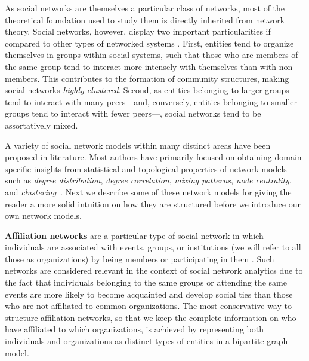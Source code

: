 As social networks are themselves a particular class of networks, most of the theoretical foundation used to study them is directly inherited from network theory.
%
Social networks, however, display two important particularities if compared to other types of networked systems \cite{Newman2003d}.
First, entities tend to organize themselves in groups within social systems, such that those who are members of the same group tend to interact more intensely with themselves than with non-members.
This contributes to the formation of community structures, making social networks \textit{highly clustered}.
Second, as entities belonging to larger groups tend to interact with many peers---and, conversely, entities belonging to smaller groups tend to interact with fewer peers---, social networks tend to be assortatively mixed.

A variety of social network models within many distinct areas have been proposed in literature.
Most authors have primarily focused on obtaining domain-specific insights from statistical and topological properties of network models such as \textit{degree distribution}, \textit{degree correlation}, \textit{mixing patterns}, \textit{node centrality}, and \textit{clustering}~\cite{Newman2003b}.
Next we describe some of these network models for giving the reader a more solid intuition on how they are structured before we introduce our own network models.


\textbf{Affiliation networks} are a particular type of social network in which individuals are associated with events, groups, or institutions (we will refer to all those as organizations) by being members or participating in them \cite{Borgatti2015}. 
%
Such networks are considered relevant in the context of social network analytics due to the fact that individuals belonging to the same groups or attending the same events are more likely to become acquainted and develop social ties than those who are not affiliated to common organizations.
%
The most conservative way to structure affiliation networks, so that we keep the complete information on who have affiliated to which organizations, is achieved by representing both individuals and organizations as distinct types of entities in a bipartite graph model.
 
